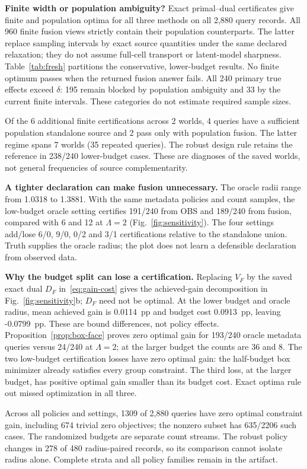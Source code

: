 \textbf{Finite width or population ambiguity?}
Exact primal--dual certificates give finite and population optima for all three methods on all 2,880 query records. All 960 finite fusion views strictly contain their population counterparts. The latter replace sampling intervals by exact source quantities under the same declared relaxation; they do not assume full-cell transport or latent-model sharpness. Table~\ref{tab:fresh} partitions the conservative, lower-budget results. No finite optimum passes when the returned fusion answer fails. All 240 primary true effects exceed $\delta$: 195 remain blocked by population ambiguity and 33 by the current finite intervals. These categories do not estimate required sample sizes.

Of the 6 additional finite certifications across 2 worlds, 4 queries have a sufficient population standalone source and 2 pass only with population fusion. The latter regime spans 7 worlds (35 repeated queries). The robust design rule retains the reference in 238/240 lower-budget cases. These are diagnoses of the saved worlds, not general frequencies of source complementarity.

\textbf{A tighter declaration can make fusion unnecessary.}
The oracle radii range from 1.0318 to 1.3881. With the same metadata policies and count samples, the low-budget oracle setting certifies 191/240 from OBS and 189/240 from fusion, compared with 6 and 12 at $\Lambda=2$ (Fig.~\ref{fig:sensitivity}). The four settings add/lose 6/0, 9/0, 0/2 and 3/1 certifications relative to the standalone union. Truth supplies the oracle radius; the plot does not learn a defensible declaration from observed data.

\textbf{Why the budget split can lose a certification.}
Replacing $V_F$ by the saved exact dual $D_F$ in~\eqref{eq:gain-cost} gives the achieved-gain decomposition in Fig.~\ref{fig:sensitivity}b; $D_F$ need not be optimal. At the lower budget and oracle radius, mean achieved gain is 0.0114~pp and budget cost 0.0913~pp, leaving -0.0799~pp. These are bound differences, not policy effects. Proposition~\ref{prop:box-face} proves zero optimal gain for 193/240 oracle metadata queries versus 24/240 at $\Lambda=2$; at the larger budget the counts are 36 and 8. The two low-budget certification losses have zero optimal gain: the half-budget box minimizer already satisfies every group constraint. The third loss, at the larger budget, has positive optimal gain smaller than its budget cost. Exact optima rule out missed optimization in all three.

Across all policies and settings, 1309 of 2,880 queries have zero optimal constraint gain, including 674 trivial zero objectives; the nonzero subset has 635/2206 such cases. The randomized budgets are separate count streams. The robust policy changes in 278 of 480 radius-paired records, so its comparison cannot isolate radius alone. Complete strata and all policy families remain in the artifact.
